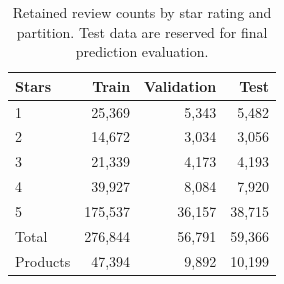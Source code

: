 \begin{table}[t]
\caption{Retained review counts by star rating and partition. Test data are reserved for final prediction evaluation.}
\label{tab:splits}
\centering\footnotesize
\begin{tabular}{@{}lrrr@{}}
\toprule
Stars & Train & Validation & Test\\\midrule
1 & 25,369 & 5,343 & 5,482\\
2 & 14,672 & 3,034 & 3,056\\
3 & 21,339 & 4,173 & 4,193\\
4 & 39,927 & 8,084 & 7,920\\
5 & 175,537 & 36,157 & 38,715\\
Total & 276,844 & 56,791 & 59,366\\
Products & 47,394 & 9,892 & 10,199\\
\bottomrule
\end{tabular}

\end{table}
